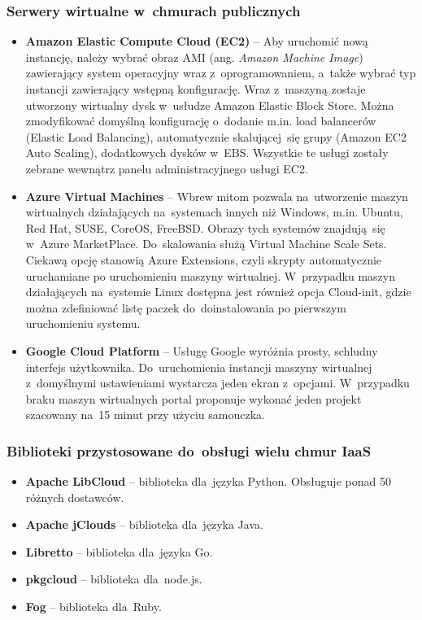 \documentclass[12pt,a4paper,twoside,titlepage,openright]{book}
\begin{document}
\subsubsection*{Serwery wirtualne w~chmurach publicznych}
\begin{itemize}
\item \textbf{Amazon Elastic Compute Cloud (EC2)} -- Aby uruchomić nową instancję, należy wybrać obraz AMI (ang. \textit{Amazon Machine Image}) zawierający system operacyjny wraz z~oprogramowaniem, a~także wybrać typ instancji zawierający wstępną konfigurację. Wraz z~maszyną zostaje utworzony wirtualny dysk w~usłudze Amazon Elastic Block Store. Można zmodyfikować domyślną konfigurację o~dodanie m.in. load balancerów (Elastic Load Balancing), automatycznie skalującej~się grupy (Amazon EC2 Auto Scaling), dodatkowych dysków w~EBS. Wszystkie te usługi zostały zebrane wewnątrz panelu administracyjnego usługi EC2.
\item \textbf{Azure Virtual Machines} -- Wbrew mitom pozwala na~utworzenie maszyn wirtualnych działających na~systemach innych niż Windows, m.in. Ubuntu, Red Hat, SUSE, CoreOS, FreeBSD. Obrazy tych systemów znajdują~się w~Azure MarketPlace. Do~skalowania służą Virtual Machine Scale Sets. Ciekawą opcję stanowią Azure Extensions, czyli skrypty automatycznie uruchamiane po uruchomieniu maszyny wirtualnej. W~przypadku maszyn działających na~systemie Linux dostępna jest również opcja Cloud-init, gdzie można zdefiniować listę paczek do~doinstalowania po pierwszym uruchomieniu systemu. 
\item \textbf{Google Cloud Platform} -- Usługę Google wyróżnia prosty, schludny interfejs użytkownika. Do~uruchomienia instancji maszyny wirtualnej z~domyślnymi ustawieniami wystarcza jeden ekran z~opcjami. W~przypadku braku maszyn wirtualnych portal proponuje wykonać jeden projekt szacowany na~15 minut przy użyciu samouczka.
\end{itemize}

\subsubsection{Biblioteki przystosowane do~obsługi wielu chmur IaaS}
\begin{itemize}
\item \textbf{Apache LibCloud} -- biblioteka dla~języka Python. Obsługuje ponad 50 różnych dostawców.
\item \textbf{Apache jClouds} -- biblioteka dla~języka Java. 
\item \textbf{Libretto} -- biblioteka dla~języka Go.
\item \textbf{pkgcloud} -- biblioteka dla~node.js.
\item \textbf{Fog} -- biblioteka dla~Ruby.
\end{itemize}
\end{document}
